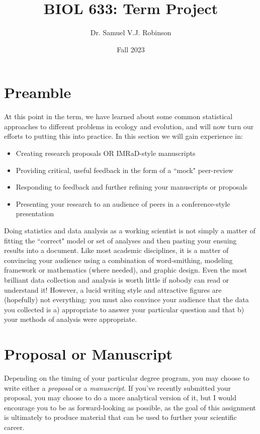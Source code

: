 \documentclass[11pt]{article}
\title{BIOL 633: Term Project}
\author{Dr. Samuel V.J. Robinson}
\date{Fall 2023}
\begin{document}
\maketitle

\section*{Preamble}

\large
At this point in the term, we have learned about some common statistical approaches to different problems in ecology and evolution, and will now turn our efforts to putting this into practice. In this section we will gain experience in: 

\begin{itemize}
\item Creating research proposals OR IMRaD-style manuscripts 
\item Providing critical, useful feedback in the form of a ``mock" peer-review
\item Responding to feedback and further refining your manuscripts or proposals
\item Presenting your research to an audience of peers in a conference-style presentation
\end{itemize}

Doing statistics and data analysis as a working scientist is not simply a matter of fitting the ``correct" model or set of analyses and then pasting your ensuing results into a document. Like most academic disciplines, it is a matter of convincing your audience using a combination of word-smithing, modeling framework or mathematics (where needed), and graphic design. Even the most brilliant data collection and analysis is worth little if nobody can read or understand it! However, a lucid writing style and attractive figures are (hopefully) not everything: you must also convince your audience that the data you collected is a) appropriate to answer your particular question and that b) your methods of analysis were appropriate.

\section*{Proposal or Manuscript}

Depending on the timing of your particular degree program, you may choose to write either a \emph{proposal} or a \emph{manuscript}. If you've recently submitted your proposal, you may choose to do a more analytical version of it, but I would encourage you to be as forward-looking as possible, as the goal of this assignment is ultimately to produce material that can be used to further your scientific career.
\end{document}
